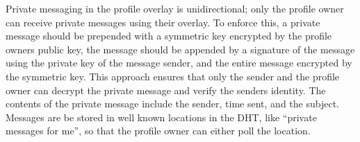 \documentclass{IEEEtran}
\begin{document}
Private messaging in the profile overlay is unidirectional; only the profile
owner can receive private messages using their overlay.  To enforce this, a
private message should be prepended with a symmetric key encrypted by the
profile owners public key, the message should be appended by a signature of the
message using the private key of the message sender, and the entire message
encrypted by the symmetric key.  This approach ensures that only the sender and
the profile owner can decrypt the private message and verify the senders
identity.  The contents of the private message include the sender, time sent,
and the subject.  Messages are be stored in well known locations in the DHT,
like ``private messages for me'', so that the profile owner can either poll the
location.



\end{document}

